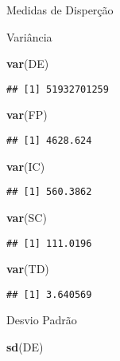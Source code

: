 \documentclass[]{article}
\newenvironment{Shaded}{\begin{snugshade}}{\end{snugshade}}
\newcommand{\KeywordTok}[1]{\textcolor[rgb]{0.13,0.29,0.53}{\textbf{#1}}}
\newcommand{\NormalTok}[1]{#1}
\begin{document}
Medidas de Disperção

Variância

\begin{Shaded}
\begin{Highlighting}[]
\KeywordTok{var}\NormalTok{(DE)}
\end{Highlighting}
\end{Shaded}

\begin{verbatim}
## [1] 51932701259
\end{verbatim}

\begin{Shaded}
\begin{Highlighting}[]
\KeywordTok{var}\NormalTok{(FP)}
\end{Highlighting}
\end{Shaded}

\begin{verbatim}
## [1] 4628.624
\end{verbatim}

\begin{Shaded}
\begin{Highlighting}[]
\KeywordTok{var}\NormalTok{(IC)}
\end{Highlighting}
\end{Shaded}

\begin{verbatim}
## [1] 560.3862
\end{verbatim}

\begin{Shaded}
\begin{Highlighting}[]
\KeywordTok{var}\NormalTok{(SC)}
\end{Highlighting}
\end{Shaded}

\begin{verbatim}
## [1] 111.0196
\end{verbatim}

\begin{Shaded}
\begin{Highlighting}[]
\KeywordTok{var}\NormalTok{(TD)}
\end{Highlighting}
\end{Shaded}

\begin{verbatim}
## [1] 3.640569
\end{verbatim}

Desvio Padrão

\begin{Shaded}
\begin{Highlighting}[]
\KeywordTok{sd}\NormalTok{(DE)}
\end{Highlighting}
\end{Shaded}
\end{document}
